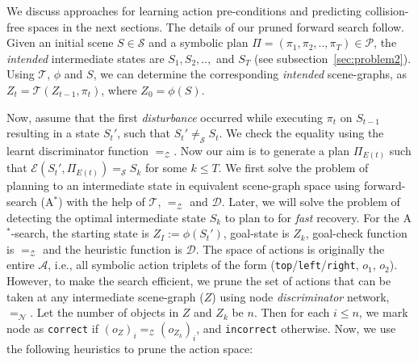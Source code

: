 We discuss approaches for learning action pre-conditions and predicting collision-free spaces in the next sections. The details of our pruned forward search follow. 
%
Given an initial scene $S \in \mathcal{S}$ and a symbolic plan $\Pi = (\pi_1, \pi_2, .., \pi_T) \in \mathcal{P}$, the \textit{intended} intermediate states are $S_1, S_2, ..,$ and $S_T$ (see subsection~\ref{sec:problem2}). Using $\mathcal{T}$, $\phi$ and $S$, we can determine the corresponding \textit{intended} scene-graphs, as $Z_t = \mathcal{T}(Z_{t-1}, \pi_t)$, where $Z_0 = \phi(S)$. 

Now, assume that the first \textit{disturbance} occurred while executing $\pi_t$ on $S_{t - 1}$ resulting in a state $S_t'$, such that $S_t' \neq_\mathcal{S} S_t$. We check the equality using the learnt discriminator function $=_\mathcal{Z}$. Now our aim is to generate a plan $\Pi_{E(t)}$ such that $\mathcal{E}(S_t', \Pi_{E(t)}) =_\mathcal{S} S_k$ for some $k \leq T$. We first solve the problem of planning to an intermediate state in equivalent scene-graph space using forward-search (A$^*$) with the help of $\mathcal{T}$, $=_\mathcal{Z}$ and $\mathcal{D}$. Later, we will solve the problem of detecting the optimal intermediate state $S_k$ to plan to for \textit{fast} recovery. For the A$^*$-search, the starting state is $Z_I := \phi(S_t')$, goal-state is $Z_k$, goal-check function is $=_\mathcal{Z}$ and the heuristic function is $\mathcal{D}$. The space of actions is originally the entire $\mathcal{A}$, i.e., all symbolic action triplets of the form (\texttt{top}/\texttt{left}/\texttt{right}, $o_1$, $o_2$). However, to make the search efficient, we prune the set of actions that can be taken at any intermediate scene-graph ($Z$) using node \textit{discriminator} network, $=_\mathcal{N}$. Let the number of objects in $Z$ and $Z_k$ be $n$. Then for each $i \leq n$, we mark node as \texttt{correct} if $(o_{Z})_i =_\mathcal{Z} (o_{Z_k})_i$, and \texttt{incorrect} otherwise. Now, we use the following heuristics to prune the action space:
